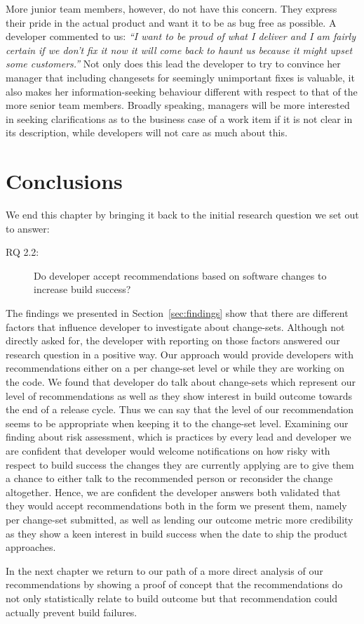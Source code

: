 More junior team members, however, do not have this concern. They express their pride in the actual product and want it to be as bug free as possible. A developer commented to us: \emph{``I want to be proud of what I deliver and I am fairly certain if we don't fix it now it will come back to haunt us because it might upset some customers.''} Not only does this lead the developer to try to convince her manager that including changesets for seemingly unimportant fixes is valuable, it also makes her information-seeking behaviour different with respect to that of the more senior team members. Broadly speaking, managers will be more interested in seeking clarifications as to the business case of a work item if it is not clear in its description, while developers will not care as much about this.


\section{Conclusions}
\label{sec:conclusions}
We end this chapter by bringing it back to the initial research question we set out to answer:
\begin{description}
  \item[RQ 2.2:] Do developer accept recommendations based on software changes to increase build success? 
\end{description}

The findings we presented in Section~\ref{sec:findings} show that there are different factors that influence developer to investigate about change-sets.
Although not directly asked for, the developer with reporting on those factors answered our research question in a positive way.
Our approach would provide developers with recommendations either on a per change-set level or while they are working on the code.
We found that developer do talk about change-sets which represent our level of recommendations as well as they show interest in build outcome towards the end of a release cycle.
Thus we can say that the level of our recommendation seems to be appropriate when keeping it to the change-set level.
Examining our finding about risk assessment, which is practices by every lead and developer we are confident that developer would welcome notifications on how risky with respect to build success the changes they are currently applying are to give them a chance to either talk to the recommended person or reconsider the change altogether.
Hence, we are confident the developer answers both validated that they would accept recommendations both in the form we present them, namely per change-set submitted, as well as lending our outcome metric more credibility as they show a keen interest in build success when the date to ship the product approaches.

In the next chapter we return to our path of a more direct analysis of our recommendations by showing a proof of concept that the recommendations do not only statistically relate to build outcome but that recommendation could actually prevent build failures.